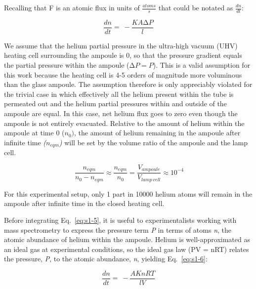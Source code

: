 Recalling that F is an atomic flux in units of \(\frac{atoms}{s}\) that
could be notated as \(\frac{dn}{dt}\):

\begin{equation}
\frac{dn}{dt} = \  - \frac{KA\mathrm{\Delta}P}{l}
\label{eq:s1-5}
\end{equation}

We assume that the helium partial pressure in the ultra-high vacuum (UHV)
heating cell surrounding the ampoule is 0, so that the pressure gradient
equals the partial pressure within the ampoule
(\(\mathrm{\Delta}P = P\)). This is a valid assumption for this work
because the heating cell is 4-5 orders of magnitude more voluminous than
the glass ampoule. The assumption therefore is only appreciably violated
for the trivial case in which effectively all the helium present within
the tube is permeated out and the helium partial pressures within and
outside of the ampoule are equal. In this case, net helium flux goes to
zero even though the ampoule is not entirely evacuated. Relative to the
amount of helium within the ampoule at time 0 (\(n_{0})\), the amount of
helium remaining in the ampoule after infinite time
\emph{(}\(n_{eqm}\)\emph{)} will be set by the volume ratio of the
ampoule and the lamp cell.

\[\ \frac{n_{eqm}}{n_{0} - n_{eqm}} \approx \frac{n_{eqm}}{n_{0}} = \frac{V_{ampoule}}{V_{lamp\ cell}} \approx 10^{- 4}\]

For this experimental setup, only 1 part in 10000 helium atoms will
remain in the ampoule after infinite time in the closed heating cell.

Before integrating Eq.~\eqref{eq:s1-5}, it is useful to experimentalists working
with mass spectrometry to express the pressure term \emph{P} in terms of
atoms \emph{n}, the atomic abundance of helium within the ampoule.
Helium is well-approximated as an ideal gas at experimental conditions,
so the ideal gas law (PV = nRT) relates the pressure, \emph{P}, to the
atomic abundance, \emph{n}, yielding Eq.~\eqref{eq:s1-6}:

\begin{equation}
\frac{dn}{dt} = \  - \frac{AKnRT}{lV}
\label{eq:s1-6}
\end{equation}

